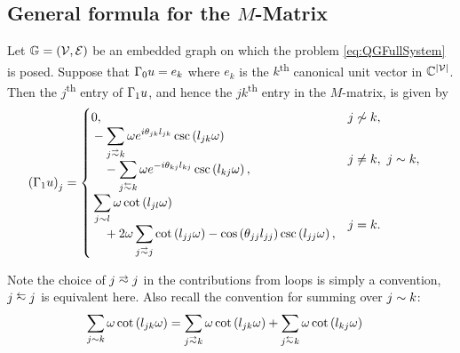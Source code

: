 \subsection{General formula for the $M$-Matrix} \label{ssec:MMatrixResult}
\begin{prop} \label{prop:M-MatrixEntries}
	Let $\mathbb{G}=\left( \mathcal{V},\mathcal{E} \right)$ be an embedded graph on which the problem \eqref{eq:QGFullSystem} is posed.
	Suppose that $\Gamma_0 u = e_k$ where $e_k$ is the $k$\textsuperscript{th} canonical unit vector in $\mathbb{C}^{\left\lvert \mathcal{V} \right\rvert}$.
	Then the $j$\textsuperscript{th} entry of $\Gamma_1 u$, and hence the $jk$\textsuperscript{th} entry in the $M$-matrix, is given by
	\begin{align*}
		\bracs{\nmap u}_j &= 
		\begin{cases}
			\!\begin{aligned}
				&0,
			\end{aligned}			
			& j \not\con k, \\
			\!\begin{aligned}
				&-\sum_{j\conLeft k} \omega e^{i\qm_{jk}l_{jk}} \csc\bracs{l_{jk}\omega} 
				\\ &\quad - \sum_{j\conRight k} \omega e^{-i\qm_{kj}l_{kj}} \csc\bracs{l_{kj}\omega},
			\end{aligned}
			& j\neq k, \ j\con k, \\
			\!\begin{aligned}
				&\sum_{j\con l} \omega\cot\bracs{l_{jl}\omega}
				\\ &\quad + 2\omega\sum_{j\conLeft j} \cot\bracs{l_{jj}\omega} - \cos\bracs{\qm_{jj}l_{jj}}\csc\bracs{l_{jj}\omega},
			\end{aligned}
			& j=k.
		\end{cases}
	\end{align*}
\end{prop}
Note the choice of $j\conLeft j$ in the contributions from loops is simply a convention, $j\conRight j$ is equivalent here.
Also recall the convention for summing over $j\sim k$:
\begin{align*}
	\sum_{j\con k} \omega\cot\bracs{l_{jk}\omega} &= \sum_{j\conLeft k} \omega\cot\bracs{l_{jk}\omega}	+ \sum_{j\conRight k} \omega\cot\bracs{l_{kj}\omega}
\end{align*}
